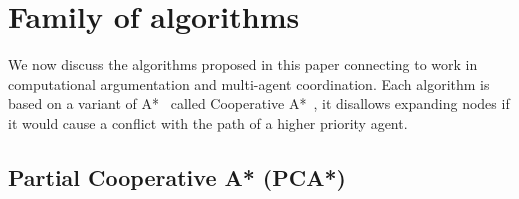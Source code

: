 \section{Family of algorithms}\label{sec:method}
We now discuss the algorithms proposed in this paper connecting to work in 
computational argumentation and multi-agent coordination. Each algorithm is 
based on a variant of A*~\cite{hart1968} called Cooperative 
A*~\cite{silver2005}, it disallows expanding nodes if it 
would cause a conflict with the path of a higher priority agent.


\subsection{Partial Cooperative A* (PCA*)}

